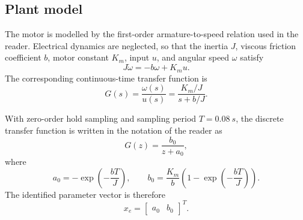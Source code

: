 \subsection{Plant model}

The motor is modelled by the first-order armature-to-speed relation used in
the reader. Electrical dynamics are neglected, so that the inertia \(J\),
viscous friction coefficient \(b\), motor constant \(K_m\), input \(u\), and
angular speed \(\omega\) satisfy
\begin{equation}
  J\dot{\omega}=-b\omega+K_m u .
  \label{eq:motor-differential-equation}
\end{equation}
The corresponding continuous-time transfer function is
\begin{equation}
  G(s)=\frac{\omega(s)}{u(s)}
      =\frac{K_m/J}{s+b/J}.
  \label{eq:motor-continuous-transfer}
\end{equation}

With zero-order hold sampling and sampling period \(T=\SI{0.08}{s}\), the
discrete transfer function is written in the notation of the reader as
\begin{equation}
  G(z)=\frac{b_0}{z+a_0},
  \label{eq:motor-discrete-transfer}
\end{equation}
where
\begin{equation}
  a_0=-\exp\!\left(-\frac{bT}{J}\right),
  \qquad
  b_0=\frac{K_m}{b}
      \left(1-\exp\!\left(-\frac{bT}{J}\right)\right).
  \label{eq:motor-discrete-parameters}
\end{equation}
The identified parameter vector is therefore
\begin{equation}
  x_e=\begin{bmatrix}a_0 & b_0\end{bmatrix}^{T}.
  \label{eq:identified-parameter-vector}
\end{equation}
